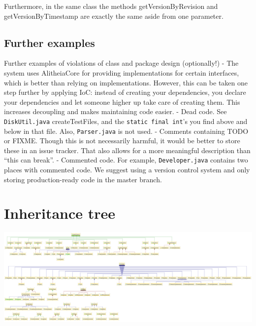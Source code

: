 \documentclass{article}
\begin{document}
Furthermore, in the same class the methods getVersionByRevision and getVersionByTimestamp are exactly the same aside from one parameter.


\subsection{Further examples}
Further examples of violations of class and package design (optionally!)
 - The system uses AlitheiaCore for providing implementations for certain interfaces, which is better than relying on implementations. However, this can be taken one step further by applying IoC: instead of creating your dependencies, you declare your dependencies and let someone higher up take care of creating them. This increases decoupling and makes maintaining code easier.
 - Dead code. See \verb|DiskUtil.java| createTestFiles, and the \verb|static final int|'s you find above and below in that file. Also, \verb|Parser.java| is not used.
 - Comments containing TODO or FIXME. Though this is not necessarily harmful, it would be better to store these in an issue tracker. That also allows for a more meaningful description than ``this can break''.
 - Commented code. For example, \verb|Developer.java| contains two places with commented code. We suggest using a version control system and only storing production-ready code in the master branch.




\newpage
\appendix
\section{Inheritance tree} \label{app:inheritance}

\begin{sideways}
	\includegraphics[width=1.3\textwidth]{inheritance-diagram}
	\label{fig:inheritance}
\end{sideways}
\end{document}
